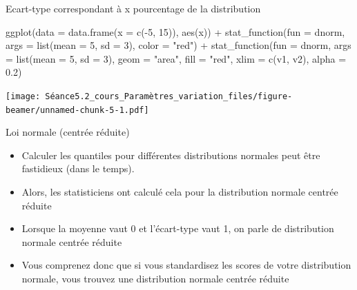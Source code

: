 \documentclass[
  ignorenonframetext,
]{beamer}
\newenvironment{Shaded}{\begin{snugshade}}{\end{snugshade}}
\newcommand{\AttributeTok}[1]{\textcolor[rgb]{0.77,0.63,0.00}{#1}}
\newcommand{\DecValTok}[1]{\textcolor[rgb]{0.00,0.00,0.81}{#1}}
\newcommand{\FloatTok}[1]{\textcolor[rgb]{0.00,0.00,0.81}{#1}}
\newcommand{\FunctionTok}[1]{\textcolor[rgb]{0.00,0.00,0.00}{#1}}
\newcommand{\NormalTok}[1]{#1}
\newcommand{\SpecialCharTok}[1]{\textcolor[rgb]{0.00,0.00,0.00}{#1}}
\newcommand{\StringTok}[1]{\textcolor[rgb]{0.31,0.60,0.02}{#1}}
\providecommand{\tightlist}{%
  \setlength{\itemsep}{0pt}\setlength{\parskip}{0pt}}
\begin{document}
\begin{frame}[fragile]{Ecart-type correspondant à x pourcentage de la
distribution}
\protect\hypertarget{ecart-type-correspondant-uxe0-x-pourcentage-de-la-distribution-2}{}
\begin{Shaded}
\begin{Highlighting}[]
\FunctionTok{ggplot}\NormalTok{(}\AttributeTok{data =} \FunctionTok{data.frame}\NormalTok{(}\AttributeTok{x =} \FunctionTok{c}\NormalTok{(}\SpecialCharTok{{-}}\DecValTok{5}\NormalTok{, }\DecValTok{15}\NormalTok{)), }\FunctionTok{aes}\NormalTok{(x)) }\SpecialCharTok{+}
  \FunctionTok{stat\_function}\NormalTok{(}\AttributeTok{fun =}\NormalTok{ dnorm, }\AttributeTok{args =} \FunctionTok{list}\NormalTok{(}\AttributeTok{mean =} \DecValTok{5}\NormalTok{, }\AttributeTok{sd =} \DecValTok{3}\NormalTok{), }\AttributeTok{color =} \StringTok{"red"}\NormalTok{) }\SpecialCharTok{+}
  \FunctionTok{stat\_function}\NormalTok{(}\AttributeTok{fun =}\NormalTok{ dnorm, }\AttributeTok{args =} \FunctionTok{list}\NormalTok{(}\AttributeTok{mean =} \DecValTok{5}\NormalTok{, }\AttributeTok{sd =} \DecValTok{3}\NormalTok{),}
                \AttributeTok{geom =} \StringTok{"area"}\NormalTok{, }\AttributeTok{fill =} \StringTok{"red"}\NormalTok{, }\AttributeTok{xlim =} \FunctionTok{c}\NormalTok{(v1, v2), }\AttributeTok{alpha =} \FloatTok{0.2}\NormalTok{)}
\end{Highlighting}
\end{Shaded}

\texttt{[image: Séance5.2\_cours\_Paramètres\_variation\_files/figure-beamer/unnamed-chunk-5-1.pdf]}
\end{frame}

\begin{frame}{Loi normale (centrée réduite)}
\protect\hypertarget{loi-normale-centruxe9e-ruxe9duite}{}
\begin{itemize}
\tightlist
\item
  Calculer les quantiles pour différentes distributions normales peut
  être fastidieux (dans le temps).
\item
  Alors, les statisticiens ont calculé cela pour la distribution normale
  centrée réduite
\item
  Lorsque la moyenne vaut 0 et l'écart-type vaut 1, on parle de
  distribution normale centrée réduite
\item
  Vous comprenez donc que si vous standardisez les scores de votre
  distribution normale, vous trouvez une distribution normale centrée
  réduite
\end{itemize}
\end{frame}
\end{document}
